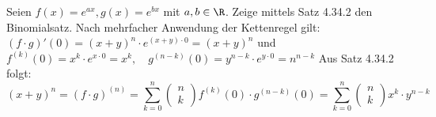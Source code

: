 \begin{example}
	Seien $f(x) = e^{ax}, g(x) = e^{bx}$ mit $a,b \in \R$. Zeige mittels Satz 4.34.2 den Binomialsatz.
	\tcblower
	Nach mehrfacher Anwendung der Kettenregel gilt:\\ $(f \cdot g)'(0) = (x+y)^n \cdot e^{(x+y) \cdot 0} = (x +
	y)^n$
	und $f^{(k)} (0) = x^k \cdot e^{x \cdot 0} = x^k, \quad g^{(n-k)} (0) = y^{n-k} \cdot e^{y \cdot 0} = n^{n-k}$
	Aus Satz 4.34.2 folgt:
	\begin{equation*}
		(x+y)^n = (f \cdot g)^{(n)} = \sum^{n}_{k=0} \begin{pmatrix}n\\k\end{pmatrix} f^{(k)} (0) \cdot g^{(n-k)}
		(0) = \sum^{n}_{k=0} \begin{pmatrix}n\\k\end{pmatrix} x^k \cdot y^{n-k}
	\end{equation*}
\end{example}